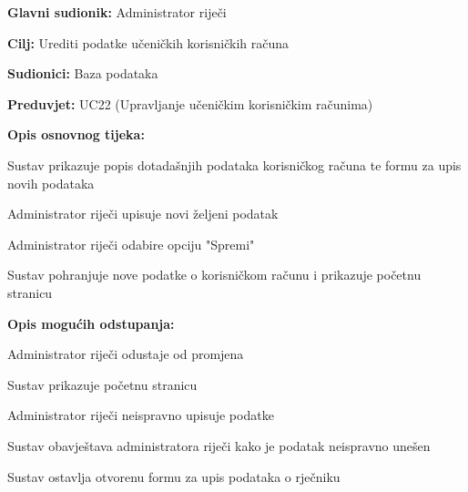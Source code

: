 				\noindent {}
				\begin{packed_item}
					
					\item \textbf{Glavni sudionik: }Administrator riječi
					\item  \textbf{Cilj:} Urediti podatke učeničkih korisničkih računa
					\item  \textbf{Sudionici:} Baza podataka
					\item  \textbf{Preduvjet:} UC22 (Upravljanje učeničkim korisničkim računima)
					\item  \textbf{Opis osnovnog tijeka:}
					
					\item[] \begin{packed_enum}
						
						\item Sustav prikazuje popis dotadašnjih podataka korisničkog računa te formu za upis novih podataka
						\item Administrator riječi upisuje novi željeni podatak
						\item Administrator riječi odabire opciju "Spremi"
						\item Sustav pohranjuje nove podatke o korisničkom računu i prikazuje početnu stranicu
						
					\end{packed_enum}
					
					\item  \textbf{Opis mogućih odstupanja:}
					
					\item[] \begin{packed_item}
						
						
						\item[3.a] Administrator riječi odustaje od promjena
						\item[] \begin{packed_enum}
							
							\item Sustav prikazuje početnu stranicu
							
						\end{packed_enum}
						
						\item[3.b] Administrator riječi neispravno upisuje podatke
						\item[] \begin{packed_enum}
							
							\item Sustav obavještava administratora riječi kako je podatak neispravno unešen
							\item Sustav ostavlja otvorenu formu za upis podataka o rječniku
							
						\end{packed_enum}
					\end{packed_item}
				\end{packed_item}
				
